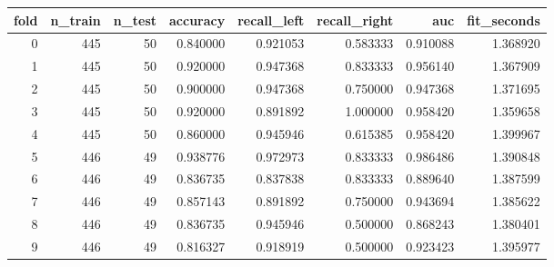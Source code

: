 \begin{tabular}{rrrrrrrr}
\toprule
fold & n_train & n_test & accuracy & recall_left & recall_right & auc & fit_seconds \\
\midrule
0 & 445 & 50 & 0.840000 & 0.921053 & 0.583333 & 0.910088 & 1.368920 \\
1 & 445 & 50 & 0.920000 & 0.947368 & 0.833333 & 0.956140 & 1.367909 \\
2 & 445 & 50 & 0.900000 & 0.947368 & 0.750000 & 0.947368 & 1.371695 \\
3 & 445 & 50 & 0.920000 & 0.891892 & 1.000000 & 0.958420 & 1.359658 \\
4 & 445 & 50 & 0.860000 & 0.945946 & 0.615385 & 0.958420 & 1.399967 \\
5 & 446 & 49 & 0.938776 & 0.972973 & 0.833333 & 0.986486 & 1.390848 \\
6 & 446 & 49 & 0.836735 & 0.837838 & 0.833333 & 0.889640 & 1.387599 \\
7 & 446 & 49 & 0.857143 & 0.891892 & 0.750000 & 0.943694 & 1.385622 \\
8 & 446 & 49 & 0.836735 & 0.945946 & 0.500000 & 0.868243 & 1.380401 \\
9 & 446 & 49 & 0.816327 & 0.918919 & 0.500000 & 0.923423 & 1.395977 \\
\bottomrule
\end{tabular}
